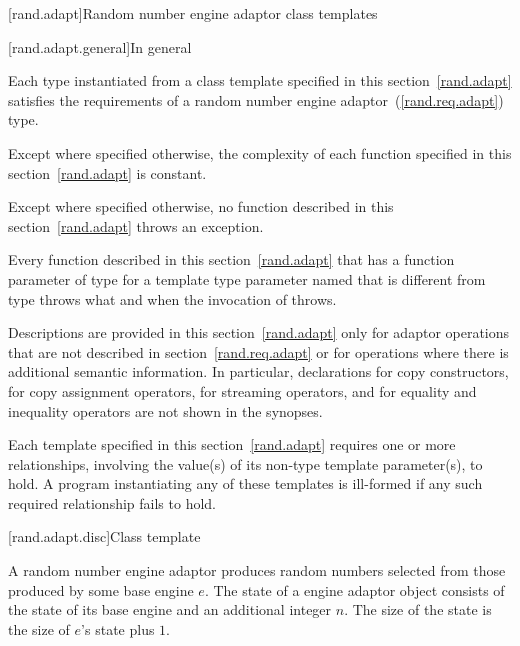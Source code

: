 [rand.adapt]{Random number engine adaptor class templates}

[rand.adapt.general]{In general}

\pnum
Each type instantiated
from a class template specified in this section~\ref{rand.adapt}
satisfies the requirements
of a random number engine adaptor~(\ref{rand.req.adapt}) type.

\pnum
Except where specified otherwise,
the complexity of each function
specified in this section~\ref{rand.adapt}
is constant.

\pnum
Except where specified otherwise,
no function described in this section~\ref{rand.adapt}
throws an exception.

\pnum
Every function described in this section~\ref{rand.adapt}
that has a function parameter  of type 
for a template type parameter named 
that is different from type 
throws what and when the invocation of  throws.

\pnum
Descriptions are provided in this section~\ref{rand.adapt}
only for adaptor operations
that are not described in section~\ref{rand.req.adapt}
or for operations where there is additional semantic information.
In particular,
declarations for copy constructors,
for copy assignment operators,
for streaming operators,
and for equality and inequality operators
are not shown in the synopses.

\pnum
Each template specified in this section~\ref{rand.adapt}
requires one or more relationships,
involving the value(s) of its non-type template parameter(s), to hold.
A program instantiating any of these templates
is ill-formed
if any such required relationship fails to hold.


[rand.adapt.disc]{Class template }%
%

\pnum
A  random number engine adaptor
produces random numbers
selected from those produced by some base engine $e$.
The state%
%
of a  engine adaptor object 
consists of the state  of its base engine 
and an additional integer $n$.
The size of the state is
 the size of $e$'s state plus $1$.

